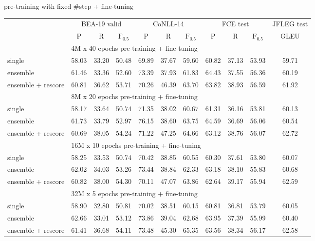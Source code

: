 \documentclass[11pt]{article}
\begin{document}
\begin{multicols}{2}
	\vspace{-1em}
	\begin{table}[H]
		\centering
		\tiny
		\tabcolsep 1.2pt
		pre-training with fixed \#step + fine-tuning \\
		\begin{tabular}{@{\extracolsep{2.5pt}}l ccc|ccc|ccc|c@{}}
			\hline
			& \multicolumn{3}{c}{BEA-19 valid}
			& \multicolumn{3}{c}{CoNLL-14}
			& \multicolumn{3}{c}{FCE test}
			& \multicolumn{1}{c}{\hspace{-2em}JFLEG test\hspace{-2em}}
			\\ \cline{2-4} \cline{5-7} \cline{8-10} \cline{11-11}
			& P & R & $\textrm{F}_{0.5}$
			& P & R & $\textrm{F}_{0.5}$
			& P & R & $\textrm{F}_{0.5}$
			& GLEU \\
			\hline
			& \multicolumn{10}{l}{4M x 40 epochs pre-training + fine-tuning} \\
			single
			& 58.03 & 33.20 & 50.48 & 69.89 & 37.67 & 59.60 & 60.82 & 37.13 & 53.93 & 59.71 \\
			ensemble
			& 61.46 & 33.36 & 52.60 & 73.39 & 37.93 & 61.83 & 64.43 & 37.55 & 56.36 & 60.19 \\
			ensemble + rescore
			& 60.81 & 36.62 & 53.71 & 70.26 & 46.39 & 63.70 & 63.82 & 38.93 & 56.59 & 61.92 \\
			\hline
			& \multicolumn{10}{l}{8M x 20 epochs pre-training + fine-tuning} \\
			single
			& 58.17 & 33.64 & 50.74 & 71.35 & 38.02 & 60.67 & 61.31 & 36.16 & 53.81 & 60.13 \\
			ensemble
			& 61.73 & 33.79 & 52.97 & 76.15 & 38.60 & 63.75 & 64.59 & 36.69 & 56.06 & 60.54 \\
			ensemble + rescore
			& 60.69 & 38.05 & 54.24 & 71.22 & 47.25 & 64.66 & 63.12 & 38.76 & 56.07 & 62.72 \\
			\hline
			& \multicolumn{10}{l}{16M x 10 epochs pre-training + fine-tuning} \\
			single
			& 58.25 & 33.53 & 50.74 & 70.42 & 38.85 & 60.55 & 60.30 & 37.61 & 53.80 & 60.07 \\
			ensemble
			& 62.02 & 34.03 & 53.26 & 73.44 & 38.84 & 62.33 & 63.18 & 38.10 & 55.83 & 60.68 \\
			ensemble + rescore
			& 60.82 & 38.00 & 54.30 & 70.11 & 47.07 & 63.86 & 62.64 & 39.17 & 55.94 & 62.59 \\
			\hline
			& \multicolumn{10}{l}{32M x 5 epochs pre-training + fine-tuning} \\
			single
			& 58.90 & 32.80 & 50.81 & 70.02 & 38.51 & 60.15 & 60.81 & 36.81 & 53.79 & 60.05 \\
			ensemble
			& 62.66 & 33.01 & 53.12 & 73.86 & 39.04 & 62.68 & 63.95 & 37.39 & 55.99 & 60.40 \\
			ensemble + rescore
			& 61.41 & 36.68 & 54.11 & 73.48 & 45.30 & 65.35 & 63.56 & 38.34 & 56.17 & 62.58 \\
			\hline
		\end{tabular}
	\end{table}


\end{multicols}
\end{document}
